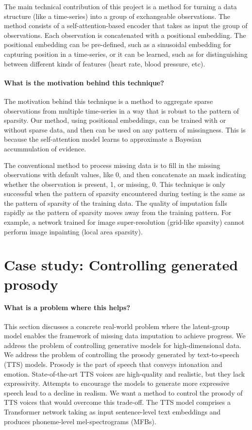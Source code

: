 \documentclass[backrefs]{cam-thesis}
\begin{document}
The main technical contribution of this project is a method for turning a data structure (like a time-series) into a group of exchangeable observations. The method consists of a self-attention-based encoder that takes as input the group of observations. Each observation is concatenated with a positional embedding. The positional embedding can be pre-defined, such as a sinusoidal embedding for capturing position in a time-series, or it can be learned, such as for distinguishing between different kinds of features (heart rate, blood pressure, etc).

\paragraph{What is the motivation behind this technique?} The motivation behind this technique is a method to aggregate sparse observations from multiple time-series in a way that is robust to the pattern of sparsity. Our method, using positional embeddings, can be trained with or without sparse data, and then can be used on any pattern of missingness. This is because the self-attention model learns to approximate a Bayesian accummulation of evidence.

The conventional method to process missing data is to fill in the missing observations with default values, like 0, and then concatenate an mask indicating whether the observation is present, 1, or missing, 0. This technique is only successful when the pattern of sparsity encountered during testing is the same as the pattern of sparsity of the training data. The quality of imputation falls rapidly as the pattern of sparsity moves away from the training pattern. For example, a network trained for image super-resolution (grid-like sparsity) cannot perform image inpainting (local area sparsity). 

\section{Case study: Controlling generated prosody}

\paragraph{What is a problem where this helps?} This section discusses a concrete real-world problem where the latent-group model enables the framework of missing data imputation to achieve progress. We address the problem of controlling generative models for high-dimensional data. We address the problem of controlling the prosody generated by text-to-speech (TTS) models. Prosody is the part of speech that conveys intonation and emotion. State-of-the-art TTS voices are high-quality and realistic, but they lack expressivity. Attempts to encourage the models to generate more expressive speech lead to a decline in realism. We want a method to control the prosody of TTS voices that would overcome this trade-off. The TTS model comprises a Transformer network taking as input sentence-level text embeddings and produces phoneme-level mel-spectrograms (MFBs).
\end{document}
